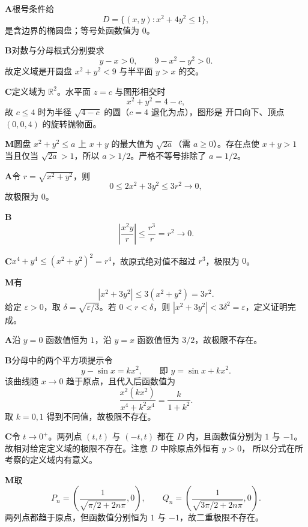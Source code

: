 \begin{solutionBox}
\textbf{A}\quad 根号条件给
\[
D=\{(x,y):x^2+4y^2\le1\},
\]
是含边界的椭圆盘；等号处函数值为 \(0\)。

\textbf{B}\quad 对数与分母根式分别要求
\[
y-x>0,\qquad 9-x^2-y^2>0.
\]
故定义域是开圆盘 \(x^2+y^2<9\) 与半平面 \(y>x\) 的交。

\textbf{C}\quad 定义域为 \(\mathbb R^2\)。水平面 \(z=c\) 与图形相交时
\[
x^2+y^2=4-c,
\]
故 \(c\le4\) 时为半径 \(\sqrt{4-c}\) 的圆（\(c=4\) 退化为点），图形是
开口向下、顶点 \((0,0,4)\) 的旋转抛物面。

\textbf{M}\quad 圆盘 \(x^2+y^2\le a\) 上 \(x+y\) 的最大值为
\(\sqrt{2a}\)（需 \(a\ge0\)）。存在点使 \(x+y>1\) 当且仅当
\(\sqrt{2a}>1\)，所以 \(a>1/2\)。严格不等号排除了 \(a=1/2\)。
\end{solutionBox}

\begin{solutionBox}
\textbf{A}\quad 令 \(r=\sqrt{x^2+y^2}\)，则
\[
0\le2x^2+3y^2\le3r^2\to0,
\]
故极限为 \(0\)。

\textbf{B}\quad
\[
\left|\frac{x^2y}{r}\right|
\le\frac{r^3}{r}=r^2\to0.
\]

\textbf{C}\quad \(x^4+y^4\le(x^2+y^2)^2=r^4\)，故原式绝对值不超过
\(r^3\)，极限为 \(0\)。

\textbf{M}\quad 有
\[
|x^2+3y^2|\le3(x^2+y^2)=3r^2.
\]
给定 \(\varepsilon>0\)，取
\(\delta=\sqrt{\varepsilon/3}\)。若 \(0<r<\delta\)，则
\(|x^2+3y^2|<3\delta^2=\varepsilon\)，定义证明完成。
\end{solutionBox}

\begin{solutionBox}
\textbf{A}\quad 沿 \(y=0\) 函数值恒为 \(1\)，沿 \(y=x\) 函数值恒为
\(3/2\)，故极限不存在。

\textbf{B}\quad 分母中的两个平方项提示令
\[
y-\sin x=kx^2,\qquad\text{即 }y=\sin x+kx^2.
\]
该曲线随 \(x\to0\) 趋于原点，且代入后函数值为
\[
\frac{x^2(kx^2)}{x^4+k^2x^4}=\frac{k}{1+k^2}.
\]
取 \(k=0,1\) 得到不同值，故极限不存在。

\textbf{C}\quad 令 \(t\to0^+\)。两列点
\((t,t)\) 与 \((-t,t)\) 都在 \(D\) 内，且函数值分别为 \(1\) 与 \(-1\)。
故相对给定定义域的极限不存在。注意 \(D\) 中除原点外恒有 \(y>0\)，
所以分式在所考察的定义域内有意义。

\textbf{M}\quad 取
\[
P_n=\left(\frac1{\sqrt{\pi/2+2n\pi}},0\right),\qquad
Q_n=\left(\frac1{\sqrt{3\pi/2+2n\pi}},0\right).
\]
两列点都趋于原点，但函数值分别恒为 \(1\) 与 \(-1\)，故二重极限不存在。
\end{solutionBox}

